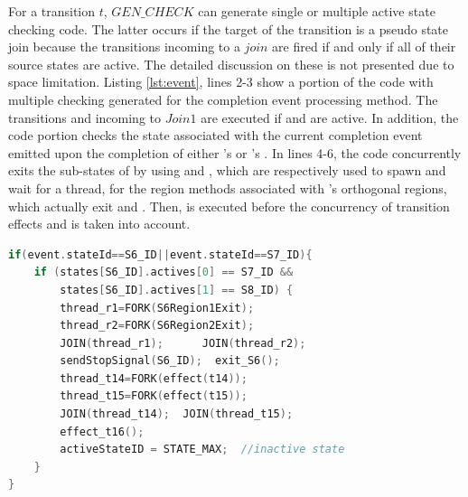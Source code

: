 For a transition $t$, $GEN\_CHECK$ can generate single or multiple active state checking code. 
The latter occurs if the target of the transition is a pseudo state join because the transitions incoming to a $join$ are fired if and only if all of their source states are active. 
The detailed discussion on these is not presented due to space limitation. Listing \ref{lst:event}, lines 2-3 show a portion of the code with multiple checking generated for the completion event processing method.
The transitions  and  incoming to $Join1$ are executed if  and  are active. 
In addition, the code portion checks the state associated with the current completion event emitted upon the completion of either 's or 's .  
In lines 4-6, the code concurrently exits the sub-states of  by using  and , which are respectively used to spawn and wait for a thread, for the region methods associated with 's orthogonal regions, which actually exit  and . 
Then,  is executed before the concurrency of transition effects  and  is taken into account.



\begin{lstlisting}[caption=Example code generated for completion events triggering transitions t14 and t15, label=lst:event, language=C++,frame=none,float]
if(event.stateId==S6_ID||event.stateId==S7_ID){
	if (states[S6_ID].actives[0] == S7_ID && 
		states[S6_ID].actives[1] == S8_ID) {
		thread_r1=FORK(S6Region1Exit); 
		thread_r2=FORK(S6Region2Exit);
		JOIN(thread_r1);  	  JOIN(thread_r2);
		sendStopSignal(S6_ID);  exit_S6();
		thread_t14=FORK(effect(t14));  
		thread_t15=FORK(effect(t15));
		JOIN(thread_t14);  JOIN(thread_t15);
		effect_t16();
		activeStateID = STATE_MAX;  //inactive state
	}
}
\end{lstlisting}
  


